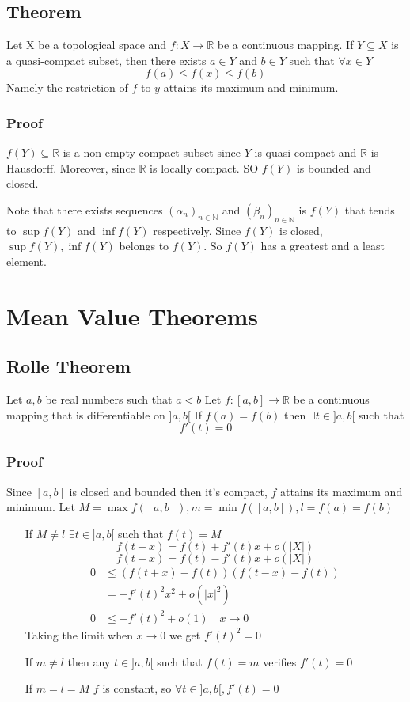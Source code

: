 \documentclass{book}
\newcommand{\abs}[1]{\left\lvert #1 \right\rvert}
\begin{document}
\section{Theorem}
Let X be a topological space and $f:X\rightarrow\mathbb{R}$ be a continuous mapping. If $Y\subseteq X$ is a quasi-compact subset, then there exists $a\in Y$ and $b\in Y$ such that $\forall x\in Y$
$$f(a)\leq f(x)\leq f(b)$$
Namely the restriction of $f$ to $y$ attains its maximum and minimum.
\subsection*{Proof}
$f(Y)\subseteq \mathbb{R}$ is a non-empty compact subset since $Y$ is quasi-compact and $\mathbb{R}$ is Hausdorff. Moreover, since $\mathbb{R}$ is locally compact. SO $f(Y)$ is bounded and closed.

Note that there exists sequences $(\alpha_n)_{n\in\mathbb{N}}$ and $(\beta_n)_{n\in\mathbb{N}}$ is $f(Y)$ that tends to $\sup f(Y)$ and $\inf f(Y)$ respectively. Since $f(Y)$ is closed, $\sup f(Y),\inf f(Y)$ belongs to $f(Y)$. So $f(Y)$ has a greatest and a least element.
\chapter{Mean Value Theorems}
\section{Rolle Theorem}
Let $a,b$ be real numbers such that $a<b$ Let $f:[a,b]\rightarrow\mathbb{R}$ be a continuous mapping that is differentiable on ${]a,b[}$ If $f(a)=f(b)$ then $\exists t\in {]a,b[}$ such that $$f'(t)=0$$
\subsection*{Proof}
Since $[a,b]$ is closed and bounded then it's compact, $f$ attains its maximum and minimum. Let $M=\max f([a,b]), m=\min f([a,b]),l=f(a)=f(b)$
\begin{itemize}
    \item [If $M\neq l$]$\exists t\in {]a,b[}$ such that $f(t)=M$$$f(t+x)=f(t)+f'(t)x+o(\abs{X})$$$$f(t-x)=f(t)-f'(t)x+o(\abs{X})$$
$$\begin{aligned}
    0 &\leq (f(t+x)-f(t))(f(t-x)-f(t))\\ &= -f'(t)^2x^2+o(\abs{x}^2)\\ 0 &\leq -f'(t)^2+o(1)\quad x\rightarrow0
\end{aligned}
$$
Taking the limit when $x\rightarrow 0$ we get $f'(t)^2=0$
    \item[If $m\neq l$]then any $t\in {]a,b[}$ such that $f(t)=m$ verifies $f'(t)=0$
    \item[If $m=l=M$] $f$ is constant, so $\forall t\in {]a,b[},f'(t)=0$
\end{itemize}
\end{document}
